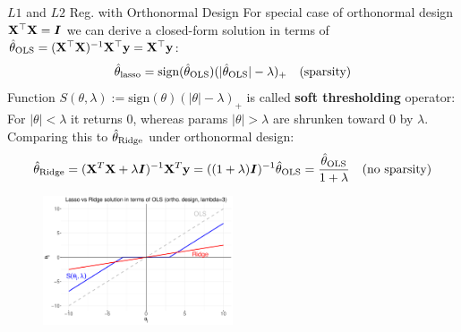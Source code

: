 \documentclass[11pt,compress,t,notes=noshow, xcolor=table]{beamer}
\begin{document}
\begin{vbframe}{$L1$ and $L2$ Reg. with Orthonormal Design}
\small For special case of orthonormal design $\mathbf{X}^{\top}\mathbf{X}=\boldsymbol{I}$ we can derive a closed-form solution in terms of $\hat{\theta}_{\text{OLS}}=(\mathbf{X}^{\top}\mathbf{X})^{-1}\mathbf{X}^{\top}\mathbf{y}=\mathbf{X}^{\top}\mathbf{y}$:
\vspace{-0.1cm}
$$\thetah_{\text{lasso}}=\text{sign}(\thetah_{\text{OLS}})(\vert \thetah_{\text{OLS}} \vert - \lambda)_{+}\quad(\text{sparsity})\vspace{-0.1cm}$$
Function $S(\theta,\lambda):=\text{sign}(\theta)(|\theta|-\lambda)_{+}$ is called \textbf{soft thresholding} operator: For $|\theta|<\lambda$ it returns $0$, whereas params $|\theta|>\lambda$ are shrunken toward $0$ by $\lambda$.\\
Comparing this to $\hat{\theta}_{\text{Ridge}}$ under orthonormal design: %
\vspace{-0.3cm}
$$\thetah_{\text{Ridge}}= ({\Xmat}^T \Xmat  + \lambda \id)^{-1} \Xmat^T\yv=((1+\lambda)\id)^{-1}\thetah_{\text{OLS}} = \frac{\thetah_{\text{OLS}}}{1+\lambda}\quad (\text{no sparsity})\vspace{-0.22cm}$$
\vspace{-0.16cm}
\begin{figure}
\includegraphics[width=0.5\textwidth]{figure_man/soft-thresholding.pdf}\\
\end{figure}

\end{vbframe}
\end{document}
